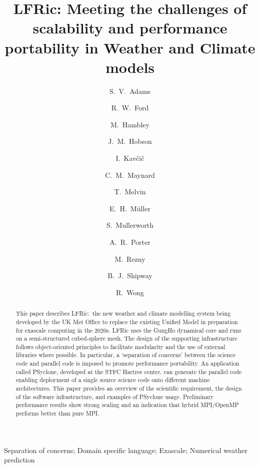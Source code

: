 \documentclass[review,times]{elsarticle}
\begin{document}
\begin{frontmatter}

\title{LFRic: Meeting the challenges of scalability and performance portability in Weather and Climate models}

\author[met]{S.~V.~Adams}
\author[hartree]{R.~W.~Ford}
\author[met]{M.~Hambley}
\author[met]{J.~M.~Hobson}
\author[met]{I.~Kav\v ci\v c}
\author[met,read]{C.~M.~Maynard}
\author[met]{T.~Melvin}
\author[bath]{E.~H.~M\"{u}ller}
\author[met]{S.~Mullerworth}
\author[hartree]{A.~R.~Porter}
\author[monash]{M.~Rezny}
\author[met]{B.~J.~Shipway}
\author[met]{R.~Wong}


\address[met]{Met Office, UK}
\address[hartree]{STFC Hartree Centre, Daresbury Laboratory, UK}
\address[read]{Department of Computer Science, University of Reading, UK}
\address[bath]{Department of Mathematics, University of Bath, UK}
\address[monash]{Monash University, Melbourne, Australia}

\begin{abstract}

  This paper describes LFRic:\ the new weather and climate modelling
  system being developed by the UK Met Office to replace the existing
  Unified Model in preparation for exascale computing in the 2020s.
  LFRic uses the GungHo dynamical core and runs on a semi-structured 
  cubed-sphere mesh. The design of the supporting infrastructure follows
  object-oriented principles to facilitate modularity and the use of
  external libraries where possible. In particular, a `separation of concerns'
  between the science code and parallel code is imposed to promote
  performance portability. An application called PSyclone, developed at the
  STFC Hartree centre, can generate the parallel code enabling deployment of
  a single source science code onto different machine architectures.
  This paper provides an overview of the scientific requirement, the design
  of the software infrastructure, and examples of PSyclone usage. Preliminary
  performance results show strong scaling and an indication that hybrid
  MPI/OpenMP performs better than pure MPI.  

\end{abstract}

\begin{keyword}
Separation of concerns; Domain specific language; Exascale; Numerical weather prediction
\end{keyword}

\end{frontmatter}
\end{document}
